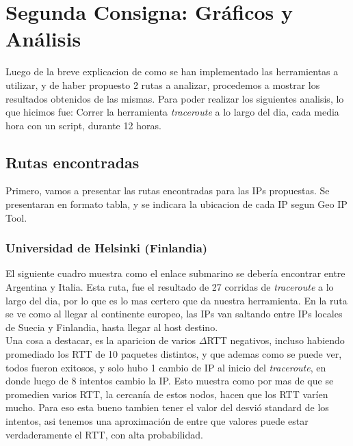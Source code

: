 \section{Segunda Consigna: Gráficos y Análisis}

Luego de la breve explicacion de como se han implementado las herramientas a utilizar, y de haber propuesto 2 rutas a analizar, procedemos a mostrar los resultados obtenidos de las mismas. Para poder realizar los siguientes analisis, lo que hicimos fue: Correr la herramienta \textit{traceroute} a lo largo del dia, cada media hora con un script, durante 12 horas.

\subsection{Rutas encontradas}

Primero, vamos a presentar las rutas encontradas para las IPs propuestas. Se presentaran en formato tabla, y se indicara la ubicacion de cada IP segun Geo IP Tool.

\subsubsection{Universidad de Helsinki (Finlandia)}

El siguiente cuadro muestra como el enlace submarino se debería encontrar entre Argentina y Italia. Esta ruta, fue el resultado de 27 corridas de \textit{traceroute} a lo largo del dia, por lo que es lo mas certero que da nuestra herramienta. En la ruta se ve como al llegar al continente europeo, las IPs van saltando entre IPs locales de Suecia y Finlandia, hasta llegar al host destino.\\

Una cosa a destacar, es la aparicion de varios $\Delta$RTT negativos, incluso habiendo promediado los RTT de 10 paquetes distintos, y que ademas como se puede ver, todos fueron exitosos, y solo hubo 1 cambio de IP al inicio del \textit{traceroute}, en donde luego de 8 intentos cambio la IP. Esto muestra como por mas de que se promedien varios RTT, la cercanía de estos nodos, hacen que los RTT varíen mucho. Para eso esta bueno tambien tener el valor del desvió standard de los intentos, asi tenemos una aproximación de entre que valores puede estar verdaderamente el RTT, con alta probabilidad.

